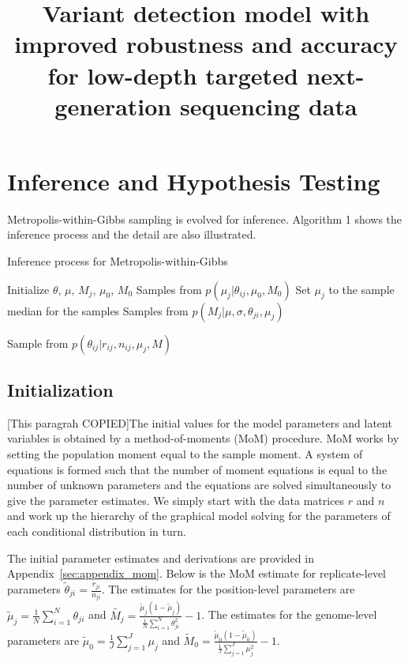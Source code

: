 \documentclass[11pt,reqno]{amsart}
\title[RVD3]{Variant detection model with improved robustness and accuracy for low-depth targeted next-generation sequencing data}
\author{}
\begin{document}
\section{Inference and Hypothesis Testing}

Metropolis-within-Gibbs sampling is evolved for inference. Algorithm 1 shows the inference process and the detail are also illustrated.

\begin{algorithm}
\caption{Inference process for Metropolis-within-Gibbs}
\label{alg:metro_gibbs}
\begin{algorithmic}[1]

\State Initialize $\theta$, $\mu$, $M_j$, $\mu_0$, $M_0$
\Repeat
{}
  \State Samples from $p \left( \mu_j |\theta_{ij},\mu_0,M_0\right)$ 
  \State Set $\mu_j$ to the sample median for the samples
  \State Samples from $p \left( M_{j} |\mu,\sigma, \theta_{ji},\mu_j\right)$ 

	\State Sample from $p \left( \theta_{ij} |r_{ij},n_{ij},\mu_j,M \right)$ 
  \EndFor

\EndFor
{}
\end{algorithmic}
\end{algorithm}

\subsection{Initialization}
[This paragrah COPIED]The initial values for the model parameters and latent variables is obtained by a method-of-moments (MoM) procedure. MoM works by setting the population moment equal to the sample moment.
A system of equations is formed such that the number of moment equations is equal to the number of unknown parameters and the equations are solved simultaneously to give the parameter estimates.
We simply start with the data matrices $r$ and $n$ and work up the hierarchy of the graphical model solving for the parameters of each conditional distribution in turn.

The initial parameter estimates and derivations are provided in Appendix~\ref{sec:appendix_mom}. Below is the MoM estimate for replicate-level parameters
$\tilde{\theta}_{ji} = \frac{r_{ji}} {n_{ji}}$.
The estimates for the position-level parameters are
$\tilde{\mu}_j = \frac{1}{N} \sum_{i=1}^N \theta_{ji}$
and
$\tilde{M_j} = \frac{ \tilde{\mu}_j (1 - \tilde{\mu}_j ) } { \frac{1}{N} \sum_{i=1}^N \theta_{ji}^2 } -1$.
The estimates for the genome-level parameters are
$\tilde{\mu}_0 = \frac{1}{J} \sum_{j=1}^J \mu_j$
and
$\tilde{M}_0 = \frac{ \tilde{\mu}_0 (1 - \tilde{\mu}_0 ) } {\frac{1}{J} \sum_{j=1}^J \mu_j^2 } -1$.
\end{document}
